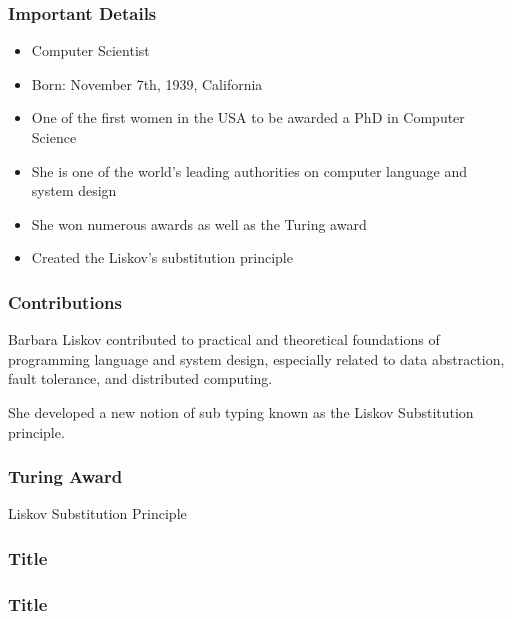 \documentclass{beamer}
\begin{document}
\begin{frame}
\frametitle{Important Details}
\begin{itemize}
\item Computer Scientist
\item Born: November 7th, 1939, California
\item One of the first women in the USA to be awarded a PhD in Computer Science
\item She is one of the world's leading authorities on computer language and system design
\item She won numerous awards as well as the Turing award
\item Created the Liskov's substitution principle
\end{itemize}
\end{frame}


\begin{frame}
\frametitle{Contributions}

Barbara Liskov contributed to practical and theoretical foundations of programming language and system design, especially related to data abstraction, fault tolerance, and distributed computing. 

\vspace{5mm} %
She developed a new notion of sub typing known as the Liskov Substitution principle.


\end{frame}


\begin{frame}
\frametitle{Turing Award}
\begin{theorem}[Title]
\centering
Liskov Substitution Principle
\end{theorem}
\end{frame}


\begin{frame}
\frametitle{Title}
\end{frame}



\begin{frame}
\frametitle{Title}
\end{frame}

\end{document}
